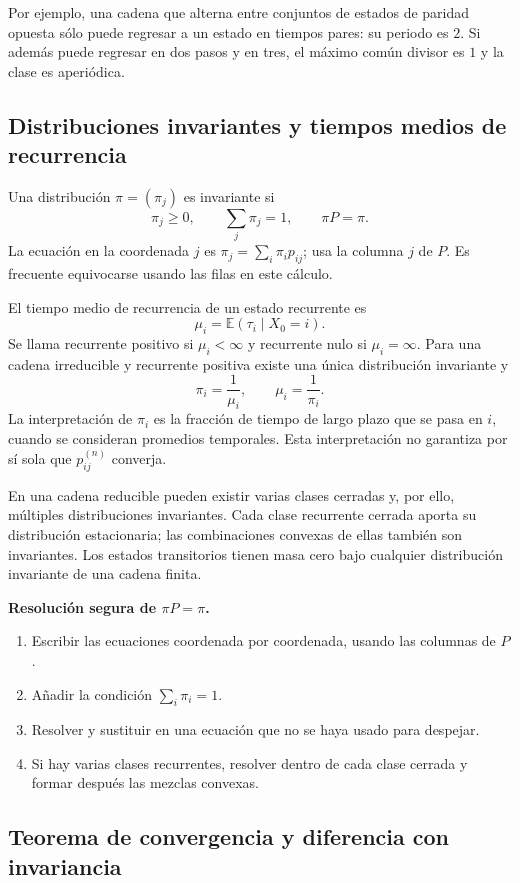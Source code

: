 \documentclass[11pt,oneside]{article}
\newcommand{\E}{\mathbb{E}}
\newcommand{\1}{\mathbf{1}}
\begin{document}
Por ejemplo, una cadena que alterna entre conjuntos de estados de paridad opuesta sólo puede regresar a un estado en tiempos pares: su periodo es $2$. Si además puede regresar en dos pasos y en tres, el máximo común divisor es $1$ y la clase es aperiódica.

\subsection{Distribuciones invariantes y tiempos medios de recurrencia}

Una distribución $\pi=(\pi_j)$ es invariante si
\[
\pi_j\geq 0,\qquad \sum_j\pi_j=1,\qquad \pi P=\pi.
\]
La ecuación en la coordenada $j$ es $\pi_j=\sum_i\pi_i p_{ij}$; usa la columna $j$ de $P$. Es frecuente equivocarse usando las filas en este cálculo.

El tiempo medio de recurrencia de un estado recurrente es
\[
\mu_i=\E(\tau_i\mid X_0=i).
\]
Se llama recurrente positivo si $\mu_i<\infty$ y recurrente nulo si $\mu_i=\infty$. Para una cadena irreducible y recurrente positiva existe una única distribución invariante y
\[
\boxed{\pi_i=\frac{1}{\mu_i},\qquad \mu_i=\frac{1}{\pi_i}.}
\]
La interpretación de $\pi_i$ es la fracción de tiempo de largo plazo que se pasa en $i$, cuando se consideran promedios temporales. Esta interpretación no garantiza por sí sola que $p_{ij}^{(n)}$ converja.

En una cadena reducible pueden existir varias clases cerradas y, por ello, múltiples distribuciones invariantes. Cada clase recurrente cerrada aporta su distribución estacionaria; las combinaciones convexas de ellas también son invariantes. Los estados transitorios tienen masa cero bajo cualquier distribución invariante de una cadena finita.

\textbf{Resolución segura de $\pi P=\pi$.}
\begin{enumerate}
  \item Escribir las ecuaciones coordenada por coordenada, usando las columnas de $P$.
  \item Añadir la condición $\sum_i\pi_i=1$.
  \item Resolver y sustituir en una ecuación que no se haya usado para despejar.
  \item Si hay varias clases recurrentes, resolver dentro de cada clase cerrada y formar después las mezclas convexas.
\end{enumerate}

\subsection{Teorema de convergencia y diferencia con invariancia}
\end{document}
